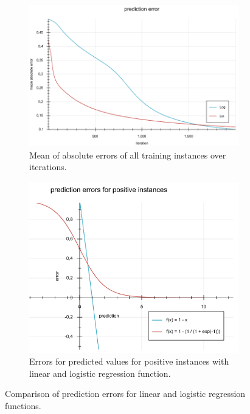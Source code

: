 \documentclass[10pt]{reportMaster}
\begin{document}
\begin{figure}[h!]
	\begin{subfigure}{0.9\textwidth}
		\centering
		\includegraphics[width=1\textwidth]{figures/experiments/errorsLogLin43}
		\caption[Mean absolute error over iterations]{Mean of absolute errors of all training instances over iterations.}
		\label{fig:errorsLogLin43}
	\end{subfigure}
	\begin{subfigure}{0.9\textwidth}
		\centering
		\includegraphics[width=1\textwidth]{figures/experiments/predictionErrors}
		\caption[Error of positive instances for different predictions]{Errors for predicted values for positive instances with linear and logistic regression function.}
		\label{fig:predictionErrors}
	\end{subfigure}
	\caption[Comparison of prediction errors for linear and logistic regression]{Comparison of prediction errors for linear and logistic regression functions.}
	\label{fig:errors}
\end{figure}
\end{document}
